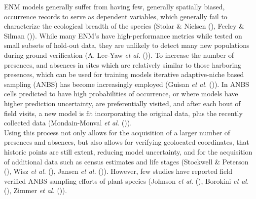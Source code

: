 \documentclass[
]{article}
\begin{document}
ENM models generally suffer from having few, generally spatially biased,
occurrence records to serve as dependent variables, which generally fail
to characterize the ecological breadth of the species (Stolar \& Nielsen
(), Feeley \& Silman
()). While many ENM's have
high-performance metrics while tested on small subsets of hold-out data,
they are unlikely to detect many new populations during ground
verification (A. Lee-Yaw \emph{et al.}
()). To increase the number of
presences, and absences in sites which are relatively similar to those
harboring presences, which can be used for training models iterative
adaptive-niche based sampling (ANBS) has become increasingly employed
(Guisan \emph{et al.} ()). In ANBS
cells predicted to have high probabilities of occurrence, or where
models have higher prediction uncertainty, are preferentially visited,
and after each bout of field visits, a new model is fit incorporating
the original data, plus the recently collected data (Mondain-Monval
\emph{et al.} ()).\\
Using this process not only allows for the acquisition of a larger
number of presences and absences, but also allows for verifying
geolocated coordinates, that historic points are still extent, reducing
model uncertainty, and for the acquisition of additional data such as
census estimates and life stages (Stockwell \& Peterson
(), Wisz \emph{et al.}
(), Jansen \emph{et al.}
()). However, few studies have
reported field verified ANBS sampling efforts of plant species (Johnson
\emph{et al.} (), Borokini \emph{et
al.} (), Zimmer \emph{et al.}
()).
\end{document}
